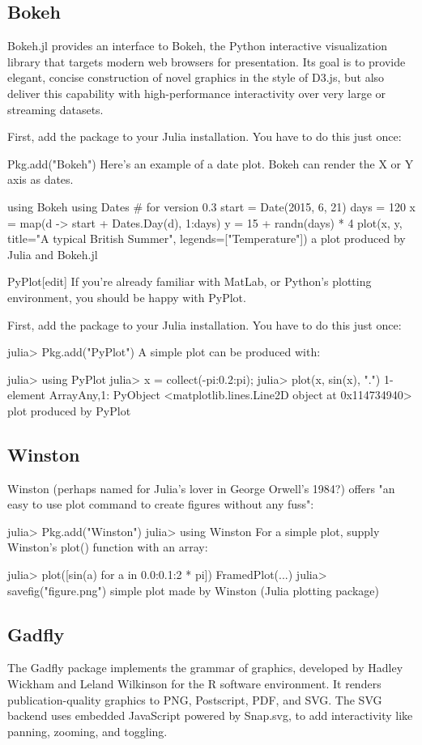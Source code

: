\subsection*{Bokeh}
Bokeh.jl provides an interface to Bokeh, the Python interactive visualization library that targets modern web browsers for presentation. Its goal is to provide elegant, concise construction of novel graphics in the style of D3.js, but also deliver this capability with high-performance interactivity over very large or streaming datasets.

First, add the package to your Julia installation. You have to do this just once:

Pkg.add("Bokeh")
Here's an example of a date plot. Bokeh can render the X or Y axis as dates.

using Bokeh
using Dates # for version 0.3
start = Date(2015, 6, 21)
days = 120
x = map(d -> start + Dates.Day(d), 1:days)
y = 15 + randn(days) * 4
plot(x, y, title="A typical British Summer", legends=["Temperature"])
a plot produced by Julia and Bokeh.jl

PyPlot[edit]
If you're already familiar with MatLab, or Python's plotting environment, you should be happy with PyPlot.

First, add the package to your Julia installation. You have to do this just once:

julia> Pkg.add("PyPlot")
A simple plot can be produced with:

julia> using PyPlot
julia> x = collect(-pi:0.2:pi);
julia> plot(x, sin(x), ".")
1-element Array{Any,1}:
 PyObject <matplotlib.lines.Line2D object at 0x114734940>
plot produced by PyPlot

\subsection*{Winston}
Winston (perhaps named for Julia's lover in George Orwell's 1984?) offers "an easy to use plot command to create figures without any fuss":

julia> Pkg.add("Winston")
julia> using Winston
For a simple plot, supply Winston's plot() function with an array:

julia> plot([sin(a) for a in 0.0:0.1:2 * pi])
FramedPlot(...)
julia> savefig("figure.png")
simple plot made by Winston (Julia plotting package)

\subsection*{Gadfly}
The Gadfly package implements the grammar of graphics, developed by Hadley Wickham and Leland Wilkinson for the R software environment. It renders publication-quality graphics to PNG, Postscript, PDF, and SVG. The SVG backend uses embedded JavaScript powered by Snap.svg, to add interactivity like panning, zooming, and toggling.

